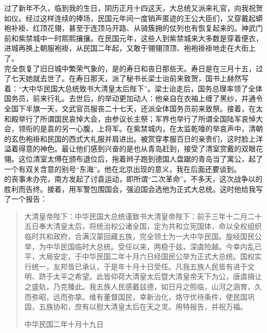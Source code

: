 过了新年不久，临到我的生日，阴历正月十四这天，大总统又派来礼官，向我祝贺如仪。经过这样连续的捧场，民国元年间一度销声匿迹的王公大臣们，又穿戴起蟒袍补褂、红顶花翎，甚至于连顶马开路、从骑簇拥的仗列也有恢复起来的。神武门前和紫禁城中一时熙熙攘攘。在民国元年，这些人到紫禁城来大多数是穿着便衣，进城再换上朝服袍褂，从民国二年起，又敢于翎翎顶顶、袍袍褂褂地走在大街上了。\\

完全恢复了旧日城中繁荣气象的，是的寿日和丧日那些天。寿日是在三月十五，过了七天她就去世了。在寿日那天，派了秘书长梁士诒前来致贺，国书上赫然写着：“大中华民国大总统致书大清皇太后陛下”。梁士诒走后，国务总理率领了全体国务员，前来行礼。去世后，的举动更加动人：他亲自在衣袖上缠了黑纱，并通令全国下半旗一天，文武官员服丧二十七天，还派全体国务员前来致祭。接着，在太和殿举行了所谓国民哀悼大会，由参议长主祭；军界也举行了所谓全国陆军哀悼大会，领衔的是袁的另一心腹，上将军。在紫禁城内，在太监乾嚎的举哀声中，清朝的玄色袍褂和民国的西式大礼服并肩进出。被赏穿孝服百日的亲贵们，这时脸上洋溢着得意的神色。最让他们感到兴奋的是也从青岛赶到，接受了清室赏戴的双眼花翎。这位清室太傅在颁布退位后，拖着辫子跑到德国人盘踞的青岛当了寓公，起了一个有双关含意的别号“东海”。他在北京出现的意义，我在后面还要谈到。\\

的丧事未办完，南方发起了讨袁运动，即所谓“二次革命”。不多天，这次战争以的胜利而告终。接着，用军警包围国会，强迫国会选他为正式大总统。这时他给我写了一个报告：\\

\begin{quote}
	大清皇帝陛下：中华民国大总统谨致书大清皇帝陛下：前于三年十二月二十五日奉大清皇太后，将统治权公诸全国，定为共和立宪国体，命以全权组织临时共和政府，合满汉蒙回藏五族，完全领土为一大中华民国。旋经国民公举，为中华民国临时大总统。受任以来，两稳于兹，深虞险越。今幸内乱已平，大局安定，于中华民国二年十月六日经国民公举为正式大总统。国权实行统一，友邦皆已承认，于是年十月十日受任。凡我五族人民皆有进于文明、跻于太平之希望。此皆仰荷大清皇太后暨大清皇帝天下为公，唐虞揖让之盛轨，乃克臻此。我五族人民感戴兹德，如日月之照临，山河之涵育，久而弥昭，远而弥挚。维有董督国民，幸新治化，烙守优待条件，使民国巩固，五族协和，庶有以慰大清皇太后在天之灵。用特报告，并祝万福。\\

\begin{flushright}
	中华民国二年十月十九日\\

\end{flushright}


\end{quote}

